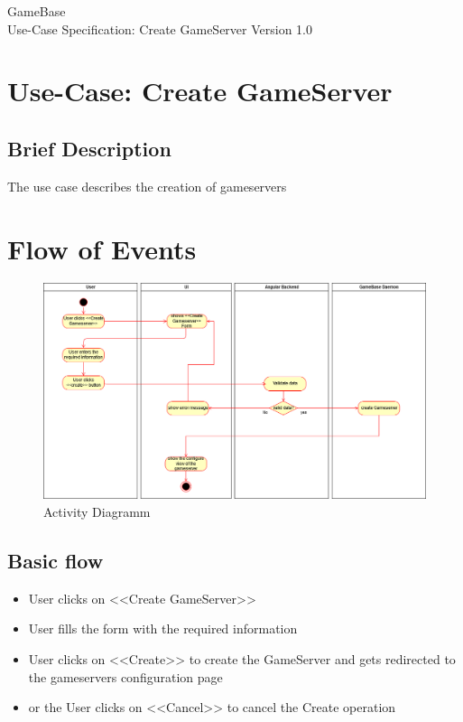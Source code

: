 \documentclass[a4paper,12pt,chapterprefix=false,bibliography=totoc,listof=totoc,book]{scrreprt}
\begin{document}
\begin{flushright}
GameBase
\\
Use-Case Specification: Create GameServer
\bigbreak
Version 1.0
\end{flushright}

\tableofcontents

\chapter{Use-Case: Create GameServer}

\section{Brief Description}
The use case describes the creation of gameservers

\chapter{Flow of Events}
\begin{figure}[H]
	\includegraphics[width=\textwidth]{CreateGameserverActivityDiagramm.png}
	\caption{Activity Diagramm}
	\label{fig:ucd}
\end{figure}
\section{Basic flow}

\begin{itemize}
    \item User clicks on <<Create GameServer>>
    \item User fills the form with the required information
    \item User clicks on <<Create>> to create the GameServer and gets redirected to the gameservers configuration page
    \item or the User clicks on <<Cancel>> to cancel the Create operation
\end{itemize}
\end{document}

